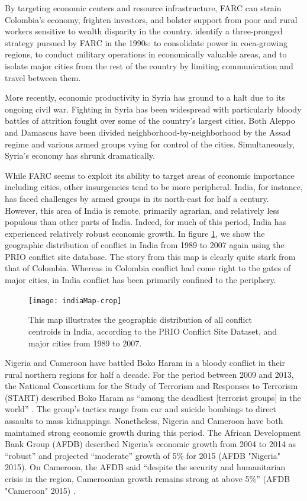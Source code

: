 By targeting economic centers and resource infrastructure, FARC can strain Colombia's economy, frighten investors, and bolster support from poor and rural workers sensitive to wealth disparity in the country. \citet{rabasa:chalk:2001} identify a three-pronged strategy pursued by FARC in the 1990s: to consolidate power in coca-growing regions, to conduct military operations in economically valuable areas, and to isolate major cities from the rest of the country by limiting communication and travel between them.  

More recently, economic productivity in Syria has ground to a halt due to its ongoing civil war. Fighting in Syria has been widespread with particularly bloody battles of attrition fought over some of the country's largest cities. Both Aleppo and Damascus have been divided neighborhood-by-neighborhood by the Assad regime and various armed groups vying for control of the cities. Simultaneously, Syria's economy has shrunk dramatically.

While FARC seems to exploit its ability to target areas of economic importance including cities, other insurgencies tend to be more peripheral. India, for instance, has faced challenges by armed groups in its north-east for half a century. However, this area of India is remote, primarily agrarian, and relatively less populous than other parts of India. Indeed, for much of this period, India has experienced relatively robust economic growth. In figure \ref{fig:indiaMap}, we show the geographic distribution of conflict in India from 1989 to 2007 again using the PRIO conflict site database. The story from this map is clearly quite stark from that of Colombia. Whereas in Colombia conflict had come right to the gates of major cities, in India conflict has been primarily confined to the periphery.

\begin{figure}[ht]
	\centering
	\texttt{[image: indiaMap-crop]}
	\caption{This map illustrates the geographic distribution of all conflict centroids in India, according to the PRIO Conflict Site Dataset, and major cities from 1989 to 2007. }
	\label{fig:indiaMap}
\end{figure}

Nigeria and Cameroon have battled Boko Haram in a bloody conflict in their rural northern regions for half a decade. For the period between 2009 and 2013, the National Consortium for the Study of Terrorism and Responses to Terrorism (START) described Boko Haram as ``among the deadliest [terrorist groups] in the world'' \citep{pate:etal:2014}. The group's tactics range from car and suicide bombings to direct assaults to mass kidnappings. Nonetheless, Nigeria and Cameroon have both maintained strong economic growth during this period. The African Development Bank Group (AFDB) described Nigeria's economic growth from 2004 to 2014 as ``robust'' and projected ``moderate'' growth of 5\% for 2015 (AFDB "Nigeria" 2015)\nocite{afdb:nigeria:2015}. On Cameroon, the AFDB said ``despite the security and humanitarian crisis in the region, Cameroonian growth remains strong at above 5\%'' (AFDB "Cameroon" 2015) \nocite{afdb:cameroon:2015}.

